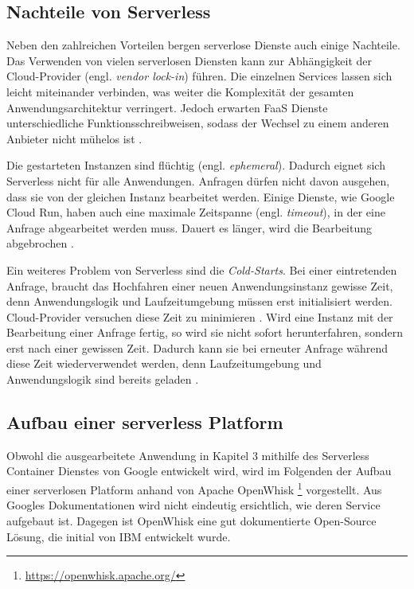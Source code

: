 \subsection{Nachteile von Serverless}
Neben den zahlreichen Vorteilen bergen serverlose Dienste auch einige Nachteile.
Das Verwenden von vielen serverlosen Diensten kann zur Abhängigkeit der
Cloud-Provider (engl. \textit{vendor lock-in}) führen. Die einzelnen
Services lassen sich leicht miteinander verbinden,
was weiter die Komplexität der gesamten Anwendungsarchitektur verringert. Jedoch erwarten
FaaS Dienste unterschiedliche Funktionsschreibweisen, sodass der Wechsel zu einem
anderen Anbieter nicht mühelos ist \cite{EcoArc}.

Die gestarteten Instanzen sind flüchtig (engl. \textit{ephemeral}). Dadurch
eignet sich Serverless nicht für alle Anwendungen. Anfragen dürfen nicht davon ausgehen, dass sie von der
gleichen Instanz bearbeitet werden. Einige Dienste, wie Google Cloud Run,
haben auch eine maximale Zeitspanne (engl. \textit{timeout}), in der eine Anfrage abgearbeitet werden muss.
Dauert es länger, wird die Bearbeitung abgebrochen \cite{CloudRunTimeout}.

Ein weiteres Problem von Serverless sind die \textit{Cold-Starts}.
Bei einer eintretenden Anfrage, braucht das Hochfahren einer neuen Anwendungsinstanz
gewisse Zeit, denn Anwendungslogik und Laufzeitumgebung müssen erst initialisiert werden.
Cloud-Provider versuchen diese Zeit zu minimieren \cite{Firecracker}. Wird eine Instanz mit der Bearbeitung einer Anfrage
fertig, so wird sie nicht sofort herunterfahren, sondern erst nach einer gewissen Zeit.
Dadurch kann sie bei erneuter Anfrage während diese Zeit wiederverwendet werden, denn Laufzeitumgebung und
Anwendungslogik sind bereits geladen \cite{ColdStartComp}.


\subsection{Aufbau einer serverless Platform}
Obwohl die ausgearbeitete Anwendung in Kapitel 3
mithilfe des Serverless Container Dienstes von Google entwickelt wird,
wird im Folgenden der Aufbau einer serverlosen Platform
anhand von Apache OpenWhisk
\footnote{\url{https://openwhisk.apache.org/}} vorgestellt.
Aus Googles Dokumentationen wird nicht eindeutig ersichtlich, wie
deren Service aufgebaut ist. Dagegen ist OpenWhisk eine
gut dokumentierte Open-Source Lösung, die initial von IBM entwickelt
wurde.

